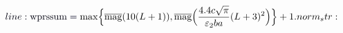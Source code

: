 \documentclass[12pt]{article}
\begin{document}
\makeatletter
\renewcommand*{\@textcolor}[3]{%
  \protect\leavevmode
  \begingroup
    \color#1{#2}#3%
  \endgroup
}
\makeatother
\begin{displaymath}
\mathcolor[RGB]{0,0,15}{line:
\text{wprssum}} \mathcolor[RGB]{0,0,30}{=} \max\Bigl\{\overline{\mbox{mag}}(10(L+1)), \overline{\mbox{mag}}\Bigl(\frac{4.4c\sqrt{\pi}}{\varepsilon_2ba}(L+3)^2\Bigr)\Bigr\}+1.

norm_str:
\end{displaymath}
\end{document}
